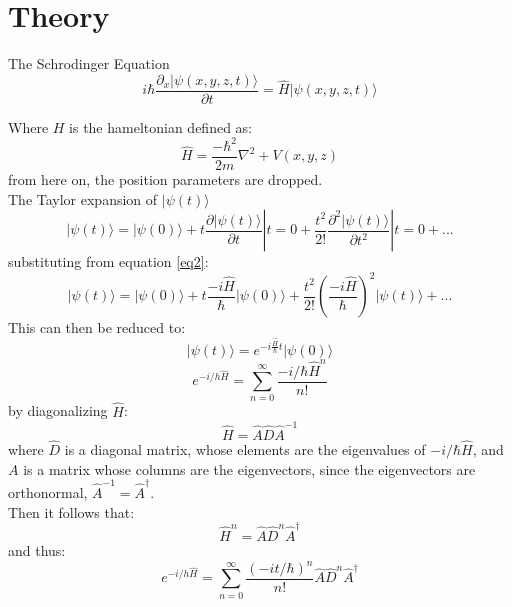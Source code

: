 \documentclass[10pt, a4paper]{article}
\begin{document}
    \section{{\Large Theory}}
    \begin{adjustwidth}{1cm}{}
    The Schrodinger Equation
    \begin{equation}    
    i\hbar\frac{\partial_x \vert\psi \left(x, y, z ,t\right)\rangle}{\partial t} = \hat{H}\vert\psi\left(x, y, z, t\right)\rangle
    \end{equation}

    Where $H$ is the hameltonian defined as:
    \begin{equation}\label{eq2}
        \hat{H} = \frac{-\hbar^2}{2m}\nabla^2 + V\left(x, y, z\right)
    \end{equation}
    from here on, the position parameters are dropped.\\
    The Taylor expansion of $\vert \psi(t) \rangle$
    \begin{equation}
        \vert\psi(t)\rangle = \vert\psi(0)\rangle + t\frac{\partial\vert\psi(t)\rangle}{\partial t}|t=0 +\frac{t^2}{2!}\frac{\partial^2\vert\psi(t)\rangle}{\partial t^2} |t=0 + ...
    \end{equation}
    substituting from equation \ref{eq2}:
    \begin{equation}
        \vert\psi(t)\rangle = \vert\psi(0)\rangle + t\frac{-i\hat{H}}{\hbar}\vert\psi(0)\rangle +\frac{t^2}{2!}\left(\frac{-i \hat{H}}{\hbar}\right)^2 \vert\psi(t)\rangle + ...
    \end{equation}
    This can then be reduced to:
    \begin{equation}\label{eq5}
        \vert\psi(t)\rangle = e^{-i\frac{\hat{H}}{\hbar}t}\vert\psi(0)\rangle
    \end{equation}
    \begin{equation}
    e^{-i/h \hat{H}} = \sum_{n=0}^{\infty} \frac{{-i/\hbar \hat{H}}^{n}}{n!}        
    \end{equation}
    by diagonalizing $\hat{H}$:
    \begin{equation}
        \hat{H} = \hat{A}\hat{D}\hat{A}^{-1}
    \end{equation}
    where $\hat{D}$ is a diagonal matrix, whose elements are the eigenvalues of $-i/\hbar \hat{H}$, and $A$ is a matrix whose columns are the eigenvectors, since the eigenvectors are orthonormal, $\hat{A}^{-1} = \hat{A}^{\dagger{}}$.\\
    
    Then it follows that:
    \begin{equation}
        \hat{H}^n =  \hat{A}\hat{D}^n\hat{A}^\dagger
    \end{equation}
    and thus:
    \begin{equation}
        e^{-i/h \hat{H}} = \sum_{n=0}^{\infty} \frac{{(-it/\hbar)}^{n}}{n!}\hat{A}\hat{D}^n\hat{A}^\dagger
    \end{equation}


\end{adjustwidth}
\end{document}

